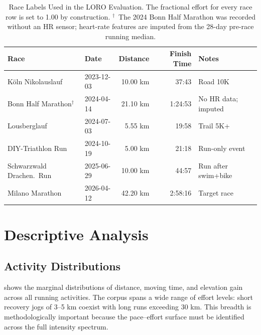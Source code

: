 \documentclass[11pt, a4paper]{article}
\begin{document}
\begin{table}[htbp]
  \centering
  \caption{Race Labels Used in the LORO Evaluation.
           The fractional effort for every race row is set to 1.00 by
           construction.
           $^\dagger$~The 2024 Bonn Half Marathon was recorded without an
           HR sensor; heart-rate features are imputed from the
           28-day pre-race running median.}
  \label{tab:races}
  \small
  \begin{tabularx}{0.95\textwidth}{llrrX}
    \toprule
    \textbf{Race} & \textbf{Date} & \textbf{Distance} & \textbf{Finish Time}
                  & \textbf{Notes} \\
    \midrule
    K\"{o}ln Nikolauslauf        & 2023-12-03 & 10.00 km & 37:43
                                 & Road 10K \\
    Bonn Half Marathon$^\dagger$ & 2024-04-14 & 21.10 km & 1:24:53
                                 & No HR data; imputed \\
    Lousberglauf                 & 2024-07-03 & 5.55 km  & 19:58
                                 & Trail 5K+ \\
    DIY-Triathlon Run            & 2024-10-19 & 5.00 km  & 21:18
                                 & Run-only event \\
    Schwarzwald Drachen.\ Run    & 2025-06-29 & 10.00 km & 44:57
                                 & Run after swim+bike \\
    Milano Marathon              & 2026-04-12 & 42.20 km & 2:58:16
                                 & Target race \\
    \bottomrule
  \end{tabularx}
\end{table}

\section{Descriptive Analysis}
\label{sec:descriptive}

\subsection{Activity Distributions}
\label{ssec:distributions}

 shows the marginal distributions of distance, moving
time, and elevation gain across all running activities.
The corpus spans a wide range of effort levels: short recovery jogs of
3--5 km coexist with long runs exceeding 30 km.
This breadth is methodologically important because the pace--effort surface
must be identified across the full intensity spectrum.
\end{document}
